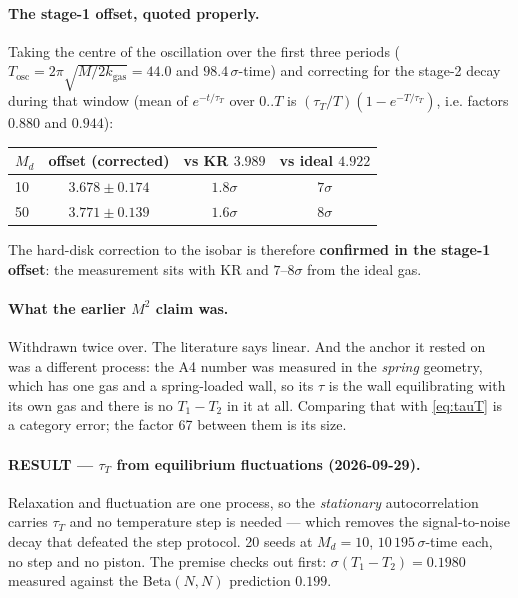\documentclass[11pt,a4paper]{article}
\begin{document}
\paragraph{The stage-1 offset, quoted properly.} Taking the centre of the oscillation over the
first three periods ($T_{\mathrm{osc}} = 2\pi\sqrt{M/2k_{\mathrm{gas}}} = 44.0$ and $98.4\,\sigma$-time)
and correcting for the stage-2 decay during that window (mean of $e^{-t/\tau_T}$ over $0..T$ is
$(\tau_T/T)(1-e^{-T/\tau_T})$, i.e. factors $0.880$ and $0.944$):
\begin{center}\small
\begin{tabular}{@{}lccc@{}}
\toprule
$M_d$ & offset (corrected) & vs KR $3.989$ & vs ideal $4.922$ \\
\midrule
10 & $3.678 \pm 0.174$ & $1.8\sigma$ & $7\sigma$ \\
50 & $3.771 \pm 0.139$ & $1.6\sigma$ & $8\sigma$ \\
\bottomrule
\end{tabular}
\end{center}
The hard-disk correction to the isobar is therefore \textbf{confirmed in the stage-1 offset}: the
measurement sits with KR and $7$--$8\sigma$ from the ideal gas.

\paragraph{What the earlier $M^2$ claim was.} Withdrawn twice over. The literature says linear. And
the anchor it rested on was a different process: the A4 number was measured in the \emph{spring}
geometry, which has one gas and a spring-loaded wall, so its $\tau$ is the wall equilibrating with
its own gas and there is no $T_1-T_2$ in it at all. Comparing that with \eqref{eq:tauT} is a
category error; the factor 67 between them is its size.

\paragraph{RESULT --- $\tau_T$ from equilibrium fluctuations (2026-09-29).} Relaxation and
fluctuation are one process, so the \emph{stationary} autocorrelation carries $\tau_T$ and no
temperature step is needed --- which removes the signal-to-noise decay that defeated the step
protocol. 20 seeds at $M_d = 10$, $10\,195\,\sigma$-time each, no step and no piston. The premise
checks out first: $\sigma(T_1-T_2) = \mathbf{0.1980}$ measured against the Beta$(N,N)$ prediction
$0.199$.
\end{document}
